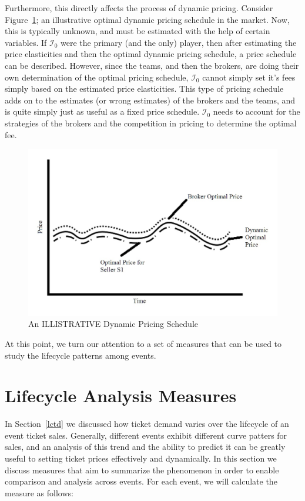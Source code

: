 \documentclass[letterpaper, 12pt]{article}
\begin{document}
Furthermore, this directly affects the process of dynamic pricing. Consider Figure~\ref{fig:idp}; an illustrative optimal dynamic pricing schedule in the market. Now, this is typically unknown, and must be estimated with the help of certain variables. If $\mathcal{I}_0$ were the primary (and the only) player, then after estimating the price elasticities and then the optimal dynamic pricing schedule, a price schedule can be described. However, since the teams, and then the brokers, are doing their own determination of the optimal pricing schedule, $\mathcal{I}_0$ cannot simply set it's fees simply based on the estimated price elasticities. This type of pricing schedule adds on to the estimates (or wrong estimates) of the brokers and the teams, and is quite simply just as useful as a fixed price schedule. $\mathcal{I}_0$ needs to account for the strategies of the brokers and the competition in pricing to determine the optimal fee. 
\begin{figure}[h]
	\centering
	\includegraphics[scale=.3]{IMG_20151201_104645518.jpg}
	\caption{An ILLISTRATIVE Dynamic Pricing Schedule}
	\label{fig:idp}
\end{figure}

At this point, we turn our attention to a set of measures that can be used to study the lifecycle patterns among events. 
\section{Lifecycle Analysis Measures}\label{lcm}
In Section~\ref{lctd} we discussed how ticket demand varies over the lifecycle of an event ticket sales. Generally, different events exhibit different curve patters for sales, and an analysis of this trend and the ability to predict it can be greatly useful to setting ticket prices effectively and dynamically. In this section we discuss measures that aim to summarize the phenomenon in order to enable comparison and analysis across events. For each event, we will calculate the measure as follows:
\end{document}
